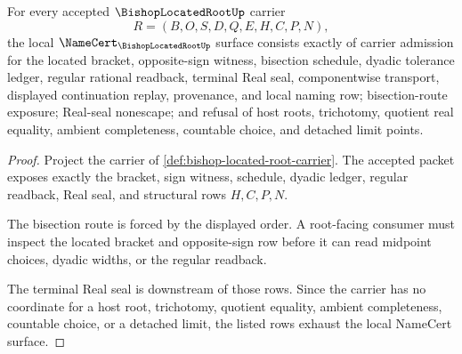 \begin{theorem}
\label{thm:bishop-located-root-namecert-obligations}
For every accepted $\BishopLocatedRootUp$ carrier
$$
R=(B,O,S,D,Q,E,H,C,P,N),
$$
the local $\NameCert_{\BishopLocatedRootUp}$ surface consists exactly of carrier admission for the located bracket, opposite-sign witness, bisection schedule, dyadic tolerance ledger, regular rational readback, terminal Real seal, componentwise transport, displayed continuation replay, provenance, and local naming row; bisection-route exposure; Real-seal nonescape; and refusal of host roots, trichotomy, quotient real equality, ambient completeness, countable choice, and detached limit points.
\end{theorem}
\begin{proof}
Project the carrier of \autoref{def:bishop-located-root-carrier}. The accepted packet exposes exactly the bracket, sign witness, schedule, dyadic ledger, regular readback, Real seal, and structural rows $H,C,P,N$.

The bisection route is forced by the displayed order. A root-facing consumer must inspect the located bracket and opposite-sign row before it can read midpoint choices, dyadic widths, or the regular readback.

The terminal Real seal is downstream of those rows. Since the carrier has no coordinate for a host root, trichotomy, quotient equality, ambient completeness, countable choice, or a detached limit, the listed rows exhaust the local NameCert surface.
\end{proof}


